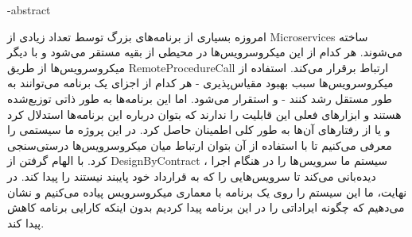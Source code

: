 \fa-abstract{
امروزه بسیاری از برنامه‌های بزرگ توسط تعداد زیادی از 
\glspl{Microservice}
ساخته می‌شوند. هر کدام از این میکروسرویس‌ها در محیطی از بقیه مستقر می‌شود و با دیگر میکروسرویس‌ها از طریق
\gls{RemoteProcedureCall}
ارتباط برقرار می‌کند. استفاده از میکروسرویس‌ها سبب بهبود مقیاس‌پذیری - هر کدام از اجزای یک برنامه می‌توانند به طور مستقل رشد کنند - و استقرار می‌شود. اما این برنامه‌‌ها به طور ذاتی توزیع‌شده هستند و ابزارهای فعلی این قابلیت را ندارند که بتوان درباره این برنامه‌ها استدلال کرد و یا از رفتارهای آن‌ها به طور کلی اطمینان حاصل کرد.
در این پروژه ما سیستمی را معرفی می‌کنیم تا با استفاده از آن بتوان ارتباط میان میکروسرویس‌ها درستی‌سنجی کرد. با الهام گرفتن از
\gls{DesignByContract}
، سیستم ما سرویس‌ها را در هنگام اجرا دیده‌بانی می‌کند تا سرویس‌هایی را که به قرارداد خود پایبند نیستند را پیدا کند. در نهایت، ما این سیستم را روی یک برنامه با معماری میکروسرویس پیاده می‌کنیم و نشان می‌دهیم که چگونه ایراداتی را در این برنامه پیدا کردیم بدون اینکه کارایی برنامه کاهش پیدا کند.

}
